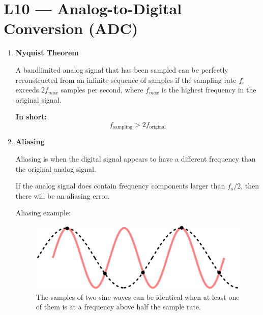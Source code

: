 \documentclass[a4paper]{article}
\begin{document}
\section*{L10 --- Analog-to-Digital Conversion (ADC)}
  \begin{enumerate}[label = \arabic*.]
    \item \textbf{Nyquist Theorem}
      \par A bandlimited analog signal that has been sampled can be perfectly reconstructed from an infinite sequence of samples if the sampling rate \( f_s \) exceeds \( 2 f_{max} \) samples per second, where \( f_{max} \) is the highest frequency in the original signal. %
      \par \textbf{In short:}
      \begin{equation*}
        f_{\text{sampling}} > 2 f_{\text{original}}
      \end{equation*}

    \item \textbf{Aliasing}
      \par Aliasing is when the digital signal appears to have a different frequency than the original analog signal.
      \par If the analog signal does contain frequency components larger than \( f_s/2 \), then there will be an aliasing error.
      \par Aliasing example:
      \begin{figure}[H]
        \centering
        \includegraphics[width=0.4\linewidth]{Nyquist_aliasing_example.png}
        \caption{The samples of two sine waves can be identical when at least one of them is at a frequency above half the sample rate.}
        \label{fig:Nyquist_aliasing_example.png}
      \end{figure}


\end{enumerate}
\end{document}
